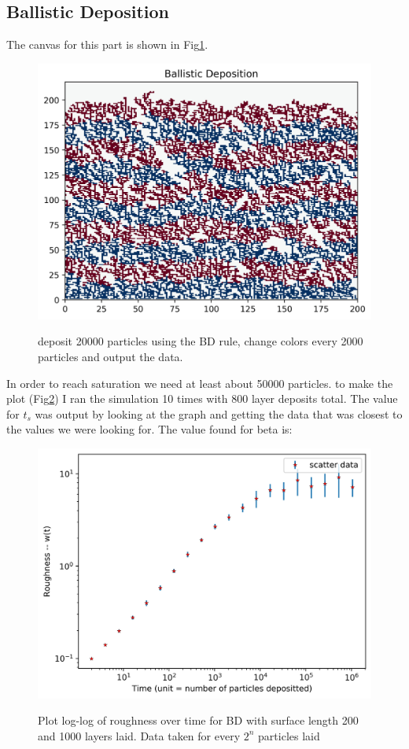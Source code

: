 \documentclass[12pt]{article}
\begin{document}
	\subsection{Ballistic Deposition}
	The canvas for this part is shown in Fig\ref{fig:BD}.
\begin{figure}[h!]
	\centering
	\includegraphics[width=.9\linewidth]{../P6/canvas.jpg}
	\label{fig:BD}
	\caption{deposit 20000 particles using the BD rule, change colors every 2000 particles and output the data.}
\end{figure}
In order to reach saturation we need
at least about 50000 particles. to make the plot (Fig\ref{fig:BDplot}) I ran the simulation 10 times with 800
layer deposits total. The value for $t_s$ was output by looking at the graph and getting
the data that was closest to the values we were looking for.
The value found for beta is:
\begin{figure}[h!]
	\centering
	\includegraphics[width=0.9\linewidth]{../P6/plot_for_beta.jpg}
	\label{fig:BDplot}
	\caption{Plot log-log of roughness over time for BD with surface length 200 and 1000 layers laid. Data taken for every $2^n$ particles laid}
\end{figure}
\end{document}
